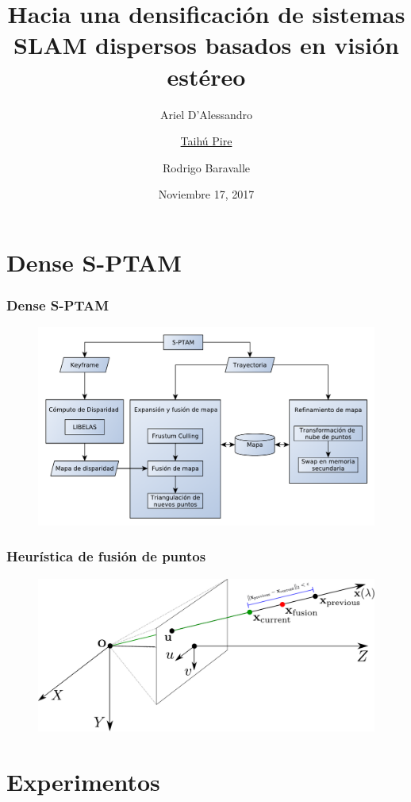 \documentclass[compress]{beamer}
\title{Hacia una densificación de sistemas SLAM	dispersos basados en visión estéreo}
\author{Ariel D'Alessandro \and \underline{Taihú Pire} \and Rodrigo Baravalle}
\institute{	CIFASIS - CONICET - UNR}
\date{\scriptsize{Noviembre 17, 2017}}
\begin{document}
\frame{\titlepage}


\section{Dense S-PTAM}

\begin{frame}
	\frametitle{Dense S-PTAM}
	\begin{figure}[htb]
		\centering
		\includegraphics[width=\columnwidth]{images/dense_diagram.pdf}
	\end{figure}
\end{frame}

\begin{frame}
	\frametitle{Heurística de fusión de puntos}
	\begin{figure}[htb]
		\centering
		\includegraphics[width=\columnwidth]{images/map_fusion.pdf}
	\end{figure}
\end{frame}

\section{Experimentos}
\end{document}
